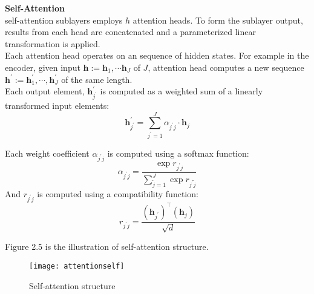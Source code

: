 %
%
\textbf{Self-Attention}\\
self-attention sublayers employs $h$ attention heads. To form the sublayer output, results from each head are concatenated and a parameterized linear transformation is applied.\\
Each attention head operates on an sequence of hidden states. For example in the encoder, given input $\bm{h}:=\bm{h}_1, \cdots \bm{h}_J$ of $J$, attention head computes a new sequence $\bm{h}^{\prime}:= \bm{h}_1^{\prime}, \cdots, \bm{h}_J^{\prime}$ of the same length.\\
Each output element, $\bm{h}_{j^{\prime}}^{\prime}$ is computed as a weighted sum of a linearly transformed input elements:
\[ \bm{h}_{j^{\prime}}^{\prime} = \sum_{{j^{\prime}}=1}^{J} \alpha_{{j^{\prime}}j}\cdot \bm{h}_{j} \]

Each weight coefficient $\alpha_{{j^{\prime}}j}$ is computed using a softmax function:
\[\alpha_{{j^{\prime}}j} = \frac{\exp {r_{{j^{\prime}}j}}}{\sum_{{\tilde{j}}=1}^{J} \exp  {r_{{j^{\prime}}{\tilde{j}}}}}\]
And $r_{{j^{\prime}}j}$ is computed using a compatibility function:
\[r_{{j^{\prime}}j} = \frac{(\bm{h}_{j^{\prime}})^{\top}(\bm{h}_j)}{\sqrt{d}} \]

Figure 2.5 is the illustration of self-attention structure.
\begin{figure}[h]
	\centering
	\texttt{[image: attentionself]}
	\caption{Self-attention structure}
\end{figure}

